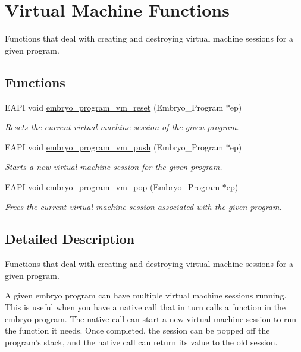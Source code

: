 \hypertarget{group__Embryo__Program__VM__Group}{
\section{Virtual Machine Functions}
\label{group__Embryo__Program__VM__Group}
}
Functions that deal with creating and destroying virtual machine sessions for a given program.  
\subsection*{Functions}
\begin{CompactItemize}
\item 
EAPI void \hyperlink{group__Embryo__Program__VM__Group_g6f85080c0f9c9d99190ccf1bdfb60a88}{embryo\_\-program\_\-vm\_\-reset} (Embryo\_\-Program $\ast$ep)
\begin{CompactList}\small\item\em Resets the current virtual machine session of the given program. \item\end{CompactList}\item 
EAPI void \hyperlink{group__Embryo__Program__VM__Group_g4c0362643f9ae872754caabe32ad9764}{embryo\_\-program\_\-vm\_\-push} (Embryo\_\-Program $\ast$ep)
\begin{CompactList}\small\item\em Starts a new virtual machine session for the given program. \item\end{CompactList}\item 
EAPI void \hyperlink{group__Embryo__Program__VM__Group_g41d2fb01dff4ca61a4eb47554d4859fe}{embryo\_\-program\_\-vm\_\-pop} (Embryo\_\-Program $\ast$ep)
\begin{CompactList}\small\item\em Frees the current virtual machine session associated with the given program. \item\end{CompactList}\end{CompactItemize}


\subsection{Detailed Description}
Functions that deal with creating and destroying virtual machine sessions for a given program. 

A given embryo program can have multiple virtual machine sessions running. This is useful when you have a native call that in turn calls a function in the embryo program. The native call can start a new virtual machine session to run the function it needs. Once completed, the session can be popped off the program's stack, and the native call can return its value to the old session.

